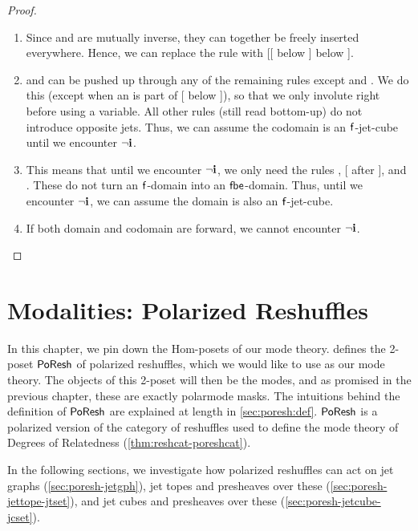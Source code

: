 \documentclass[a4paper]{memoir}
\begin{document}
\begin{proof}
\begin{enumerate}
		\item Since  and  are mutually inverse, they can together be freely inserted everywhere. Hence, we can replace the rule  with [[ below ] below ].
		\item {} and  can be pushed up through any of the remaining rules except  and .
		We do this (except when an  is part of [ below ]), so that we only involute right before using a variable.
		All other rules (still read bottom-up) do not introduce opposite jets.
		Thus, we can assume the codomain is an ${\mathsf{f}}$-jet-cube until we encounter $\lnot \mathbf{i}$.
		\item This means that until we encounter $\lnot \mathbf{i}$, we only need the rules , [ after ],  and .
		These do not turn an ${\mathsf{f}}$-domain into an ${\mathsf{fbe}}$-domain. Thus, until we encounter $\lnot \mathbf{i}$, we can assume the domain is also an ${\mathsf{f}}$-jet-cube.
		\item If both domain and codomain are forward, we cannot encounter $\lnot \mathbf{i}$. \qedhere
	\end{enumerate}
\end{proof}

\chapter{Modalities: Polarized Reshuffles} \label{ch:modalities}
In this chapter, we pin down the Hom-posets of our mode theory.
 defines the 2-poset $\mathsf{PoResh}$ of polarized reshuffles, which we would like to use as our mode theory. The objects of this 2-poset will then be the modes, and as promised in the previous chapter, these are exactly polarmode masks.
The intuitions behind the definition of $\mathsf{PoResh}$ are explained at length in \cref{sec:poresh:def}.
$\mathsf{PoResh}$ is a polarized version of the category of reshuffles used to define the mode theory of Degrees of Relatedness \cite{reldtt,reldtt-techreport} (\cref{thm:reshcat-poreshcat}).

In the following sections, we investigate how polarized reshuffles can act on jet graphs (\cref{sec:poresh-jetgph}), jet topes and presheaves over these  (\cref{sec:poresh-jettope-jtset}), and jet cubes and presheaves over these (\cref{sec:poresh-jetcube-jcset}).
\end{document}
